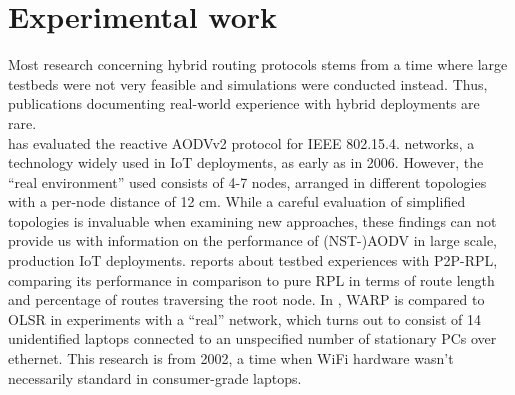 \documentclass[a4paper,10pt]{scrartcl}
\begin{document}

\section{Experimental work}
\label{sec:experiments}
Most research concerning hybrid routing protocols stems from a time where large testbeds were not very feasible and simulations were conducted instead. %
Thus, publications documenting real-world experience with hybrid deployments are rare.\\

\cite{gomez_NSTAODV_eval} has evaluated the reactive AODVv2 protocol for IEEE 802.15.4. networks, a technology widely used in IoT deployments, as early as in 2006. However, the ``real environment'' used consists of 4-7 nodes, arranged in different topologies with a per-node distance of 12 cm. While a careful evaluation of simplified topologies is invaluable when examining new approaches, these findings can not provide us with information on the performance of (NST-)AODV in large scale, production IoT deployments.
\cite{baccelli_p2p_rpl} reports about testbed experiences with P2P-RPL, comparing its performance in comparison to pure RPL in terms of route length and percentage of routes traversing the root node.
In \cite{WARP}, WARP is compared to OLSR in experiments with a ``real'' network, which turns out to consist of 14 unidentified laptops connected to an unspecified number of stationary PCs over ethernet. This research is from 2002, a time when WiFi hardware wasn't necessarily standard in consumer-grade laptops.\\
\end{document}
